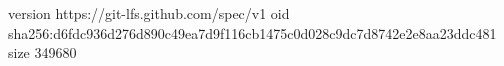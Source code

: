 version https://git-lfs.github.com/spec/v1
oid sha256:d6fdc936d276d890c49ea7d9f116cb1475c0d028c9dc7d8742e2e8aa23ddc481
size 349680
